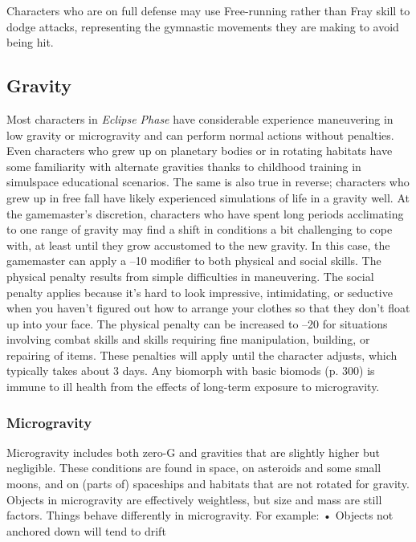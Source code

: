 Characters who are on full defense may use Free-running
rather than Fray skill to dodge attacks, representing
the gymnastic movements they are making to
avoid being hit.

\subsection{Gravity}

Most characters in \textit{Eclipse Phase} have considerable 
experience maneuvering in low gravity or microgravity
and can perform normal actions without
penalties. Even characters who grew up on planetary 
bodies or in rotating habitats have some familiarity 
with alternate gravities thanks to childhood training
in simulspace educational scenarios. The same is
also true in reverse; characters who grew up in free 
fall have likely experienced simulations of life in a 
gravity well.
At the gamemaster's discretion, characters who 
have spent long periods acclimating to one range of 
gravity may find a shift in conditions a bit challenging
to cope with, at least until they grow accustomed
to the new gravity. In this case, the gamemaster can 
apply a –10 modifier to both physical and social skills. 
The physical penalty results from simple difficulties 
in maneuvering. The social penalty applies because 
it's hard to look impressive, intimidating, or seductive 
when you haven't figured out how to arrange your 
clothes so that they don't float up into your face. The 
physical penalty can be increased to –20 for situations
involving combat skills and skills requiring fine
manipulation, building, or repairing of items. These 
penalties will apply until the character adjusts, which 
typically takes about 3 days.
Any biomorph with basic biomods (p. 300) is 
immune to ill health from the effects of long-term 
exposure to microgravity.

\subsubsection{Microgravity}

Microgravity includes both zero-G and gravities that 
are slightly higher but negligible. These conditions are 
found in space, on asteroids and some small moons, 
and on (parts of) spaceships and habitats that are not 
rotated for gravity. Objects in microgravity are effectively
weightless, but size and mass are still factors.
Things behave differently in microgravity. For 
example:
•  Objects not anchored down will tend to drift 

